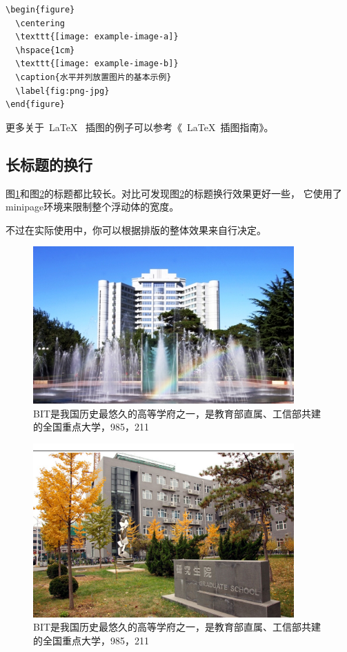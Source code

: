 \begin{lstlisting}[language={[LaTeX]TeX}, caption={插入PNG/JPG}]
\begin{figure}
  \centering
  \texttt{[image: example-image-a]}
  \hspace{1cm}
  \texttt{[image: example-image-b]}
  \caption{水平并列放置图片的基本示例}
  \label{fig:png-jpg}
\end{figure}
\end{lstlisting}

更多关于~\LaTeX~ 插图的例子可以参考《~\LaTeX~插图指南》。

\subsection{长标题的换行}
\label{sec:longcaption}

图\ref{fig:longcaptionbad}和图\ref{fig:longcaptiongood}的标题都比较长。对比可发现图\ref{fig:longcaptiongood}的标题换行效果更好一些，
它使用了minipage环境来限制整个浮动体的宽度。

不过在实际使用中，你可以根据排版的整体效果来自行决定。

\begin{figure}
 \centering
 \includegraphics[width=10cm]{figures/pic1}
 \caption{BIT是我国历史最悠久的高等学府之一，是教育部直属、工信部共建的全国重点大学，985，211}
 \label{fig:longcaptionbad}
\end{figure}

\begin{figure}
  \centering
  \begin{minipage}[b]{0.6\textwidth}
  \centering
  \includegraphics[width=10cm]{figures/pic2}
  \caption{BIT是我国历史最悠久的高等学府之一，是教育部直属、工信部共建的全国重点大学，985，211}
  \label{fig:longcaptiongood}
   \end{minipage}     
\end{figure}

